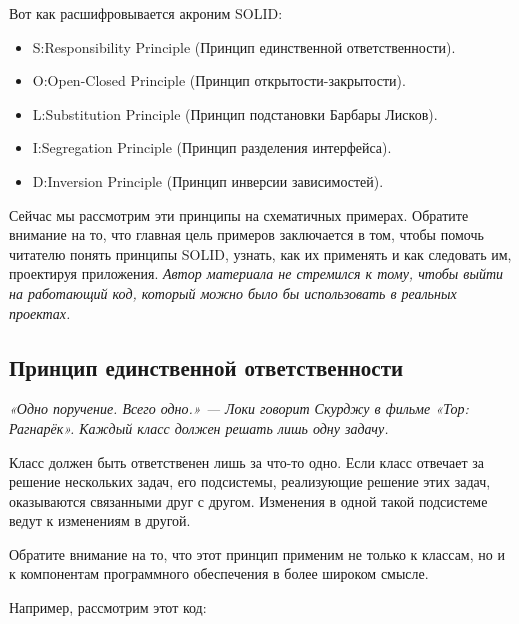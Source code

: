 \documentclass[a4paper]{article}
\begin{document}
Вот как расшифровывается акроним SOLID:\@
\begin{itemize}
    \item S:\@Single Responsibility Principle (Принцип единственной ответственности).
    \item O:\@ Open-Closed Principle (Принцип открытости-закрытости).
    \item L:\@Liskov Substitution Principle (Принцип подстановки Барбары Лисков).
    \item I:\@Interface Segregation Principle (Принцип разделения интерфейса).
    \item D:\@Dependency Inversion Principle (Принцип инверсии зависимостей).
\end{itemize}
Сейчас мы рассмотрим эти принципы на схематичных примерах. Обратите внимание на то, что главная цель примеров заключается в том, чтобы помочь читателю понять принципы SOLID, узнать, как их применять и как следовать им, проектируя приложения. \textit{Автор материала не стремился к тому, чтобы выйти на работающий код, который можно было бы использовать в реальных проектах.}

\subsection{Принцип единственной ответственности}

\textit{«Одно поручение. Всего одно.» — Локи говорит Скурджу в фильме «Тор: Рагнарёк».
Каждый класс должен решать лишь одну задачу.}

Класс должен быть ответственен лишь за что-то одно. Если класс отвечает за решение нескольких задач, его подсистемы, реализующие решение этих задач, оказываются связанными друг с другом. Изменения в одной такой подсистеме ведут к изменениям в другой.

Обратите внимание на то, что этот принцип применим не только к классам, но и к компонентам программного обеспечения в более широком смысле.

Например, рассмотрим этот код:

\begin{figure}[h]
\end{figure}
\end{document}

